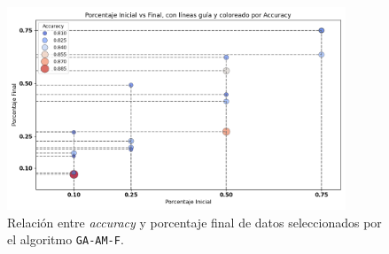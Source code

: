 \begin{figure}[htp]
  \centering
  \includegraphics[width=0.9\textwidth]{imagenes/evaluaciones/libres/scatter_ga-am-f.png}
  \caption{Relación entre \textit{accuracy} y porcentaje final de datos seleccionados por el algoritmo \texttt{GA-AM-F}.}
  \label{fig:scatter_gen_v2}
\end{figure}

